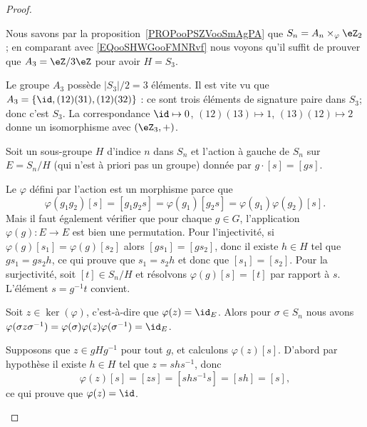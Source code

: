 \begin{proof}
\begin{subproof}
		Nous savons par la proposition~\ref{PROPooPSZVooSmAgPA} que \( S_n=A_n\times_{\varphi}\eZ_2\); en comparant avec \eqref{EQooSHWGooFMNRvf} nous voyons qu'il suffit de prouver que \( A_3=\eZ/3\eZ\) pour avoir \( H=S_3\).

		Le groupe \( A_3\) possède \( | S_3 |/2=3\) éléments. Il est vite vu que \( A_3=\{ \id,(12)(31), (12)(32) \}\) : ce sont trois éléments de signature paire dans \( S_3\); donc c'est \( S_3\). La correspondance \( \id\mapsto 0\), \( (12)(13)\mapsto 1\), \( (13)(12)\mapsto 2\) donne un isomorphisme avec \( (\eZ_3,+)\).


		Soit un sous-groupe \( H\) d'indice \( n\) dans \( S_n\) et l'action à gauche de \( S_n\) sur \( E=S_n/H\) (qui n'est à priori pas un groupe) donnée par \( g\cdot [s]=[gs]\).

		\begin{subproof}

			Le \( \varphi\) défini par l'action est un morphisme parce que
			\begin{equation}
				\varphi(g_1g_2)[s]=[g_1g_2s]=\varphi(g_1)[g_2s]=\varphi(g_1)\varphi(g_2)[s].
			\end{equation}
			Mais il faut également vérifier que pour chaque \( g\in G\), l'application \( \varphi(g)\colon E\to E\) est bien une permutation. Pour l'injectivité, si \( \varphi(g)[s_1]=\varphi(g)[s_2]\) alors \( [gs_1]=[gs_2]\), donc il existe \( h\in H\) tel que \( gs_1=gs_2h\), ce qui prouve que \( s_1=s_2h\) et donc que \( [s_1]=[s_2]\). Pour la surjectivité, soit \( [t]\in S_n/H\) et résolvons \( \varphi(g)[s]=[t]\) par rapport à \( s\). L'élément \( s=g^{-1} t\) convient.


			Soit \( z\in\ker(\varphi)\), c'est-à-dire que \( \varphi(z)=\id_E\). Alors pour \( \sigma\in S_n\) nous avons \( \varphi(\sigma z\sigma^{-1})=\varphi(\sigma)\varphi(z)\varphi(\sigma^{-1})=\id_E\).

			\spitem[\( \ker(\varphi)=\bigcap_{g\in S_n}gHg^{-1}\)]

			Supposons que \( z\in gHg^{-1}\) pour tout \( g\), et calculons \( \varphi(z)[s]\). D'abord par hypothèse il existe \( h\in H\) tel que \( z=shs^{-1}\), donc
			\begin{equation}
                \varphi(z)[s]=[zs]=[shs^{-1}s]=[sh]=[s],
			\end{equation}
			ce qui prouve que \( \varphi(z)=\id\).


\end{subproof}
\end{subproof}
\end{proof}
